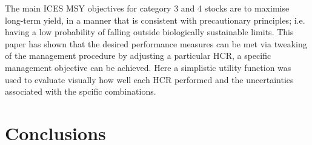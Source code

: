 \documentclass[preprint,review,12pt]{elsarticle}
\begin{document}
The main ICES MSY objectives for category 3 and 4 stocks are to maximise long-term yield, in a manner that is consistent with precautionary principles; i.e. having a low probability of falling outside biologically sustainable limits.  This paper has shown that the desired performance measures can be met via tweaking of the management procedure by adjusting a particular HCR, a specific management objective can be achieved. Here a simplistic utility function was used to evaluate visually how well each HCR performed and the uncertainties associated with the spcific combinations.



\section{Conclusions}




 

\end{document}
